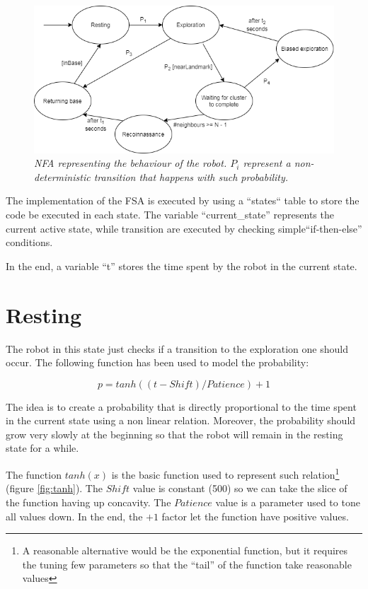 \begin{figure}[H]
\centering
\includegraphics[width=\linewidth]{images/NFA.png}
\caption{\textit{NFA representing the behaviour of the robot. $P_i$ represent a non-deterministic transition that happens with such probability.}}
\label{fig:NFA}
\end{figure}

The implementation of the FSA is executed by using a ``states`` table to store the code be executed in each state. The variable ``current\_state'' represents the current active state, while transition are executed by checking simple``if-then-else'' conditions.

\noindent
In the end, a variable ``t'' stores the time spent by the robot in the current state.

\section{Resting}

The robot in this state just checks if a transition to the exploration one should occur. The following function has been used to model the probability:

\begin{center}
$$ p = tanh((t - Shift) / Patience) + 1 $$
\end{center} 

\noindent
The idea is to create a probability that is directly proportional to the time spent in the current state using a non linear relation. Moreover, the probability should grow very slowly at the beginning so that the robot will remain in the resting state for a while. 

\noindent
The function $tanh(x)$ is the basic function used to represent such relation\footnote{A reasonable alternative would be the exponential function, but it requires the tuning few parameters so that the ``tail'' of the function take reasonable values} (figure \ref{fig:tanh}). The $Shift$ value is constant (500) so we can take the slice of the function having up concavity. The $Patience$ value is a parameter used to tone all values down. In the end, the $+1$ factor let the function have positive values.  

